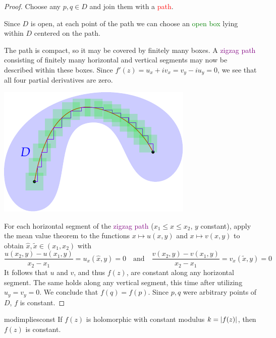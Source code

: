 \begin{proof}
	Choose any $p,q\in D$ and join them with a \textcolor{red}{path}.\par 
	\begin{minipage}[t]{0.6\linewidth}\vspace{-7pt}
		Since $D$ is open, at each point of the path we can choose an \textcolor{Green}{open box} lying within $D$ centered on the path.\par
		The path is compact, so it may be covered by finitely many boxes. A \textcolor{purple}{zigzag path} consisting of finitely many horizontal and vertical segments may now be described within these boxes.\smallbreak
		Since $f'(z)=u_x+iv_x=v_y-iu_y=0$, we see that all four partial derivatives are zero.
	\end{minipage}
	\hfill
	\begin{minipage}[t]{0.39\linewidth}\vspace{-10pt}
		\flushright\includegraphics{analytic-topology}
	\end{minipage}\medbreak
	For each horizontal segment of the \textcolor{purple}{zigzag path} ($x_1\le x\le x_2$, $y$ constant), apply the mean value theorem to the functions $x\mapsto u(x,y)$ and $x\mapsto v(x,y)$ to obtain $\widehat x,\widetilde x\in (x_1,x_2)$ with
	\[
		\frac{u(x_2,y)-u(x_1,y)}{x_2-x_1}=u_x(\widehat x,y)=0\quad\text{and}\quad \frac{v(x_2,y)-v(x_1,y)}{x_2-x_1}=v_x(\widetilde x,y)=0
	\]
	It follows that $u$ and $v$, and thus $f(z)$, are constant along any horizontal segment.\smallbreak
	The same holds along any vertical segment, this time after utilizing $u_y=v_y=0$.\smallbreak
	We conclude that $f(q)=f(p)$. Since $p,q$ were arbitrary points of $D$, $f$ is constant.
\end{proof}


\begin{cor}{}{modimpliesconst}
	If $f(z)$ is holomorphic with constant modulus $k=\left| f(z)\right|$, then $f(z)$ is constant. 
\end{cor}

